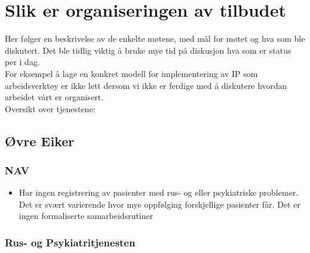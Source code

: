 \documentclass[11pt]{report} %
\begin{document}
                \chapter{Slik er organiseringen av tilbudet}\label{chap:org}
                  Her følger en beskrivelse av de enkelte møtene, med mål for møtet og hva som ble diskutert. Det ble tidlig viktig å bruke mye tid på diskusjon hva som er status per i dag.\\
                  For eksempel å lage en konkret modell for implementering av IP som arbeidsverktøy er ikke lett dersom vi ikke er ferdige med å diskutere hvordan arbeidet vårt er organisert.\\
                  Oversikt over tjenestene:\\
                   
                  \section{Øvre Eiker}\label{sec:org_oek}
                      
                      \subsection{NAV}
                        \begin{itemize} 
                          \item Har ingen registrering av pasienter med rus- og eller psykiatriske problemer. Det er svært varierende hvor mye oppfølging forskjellige pasienter får. Det er ingen formaliserte samarbeidsrutiner
                        \end{itemize}
                      
                      \subsection{Rus- og Psykiatritjenesten}
                      	
\end{document}
